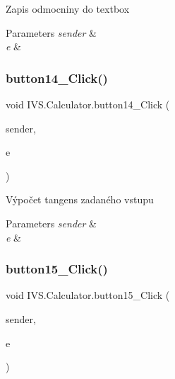 Zapis odmocniny do textbox 


\begin{DoxyParams}{Parameters}
{\em sender} & \\
\hline
{\em e} & \\
\hline
\end{DoxyParams}
\mbox{\label{class_i_v_s_1_1_calculator_acbac3db9d87c440d5f18b67349b8cd29}} 
\subsubsection{\texorpdfstring{button14\+\_\+\+Click()}{button14\_Click()}}
{\footnotesize\ttfamily void I\+V\+S.\+Calculator.\+button14\+\_\+\+Click (\begin{DoxyParamCaption}\item[{object}]{sender,  }\item[{Event\+Args}]{e }\end{DoxyParamCaption})\hspace{0.3cm}{\ttfamily [protected]}}



Výpočet tangens zadaného vstupu 


\begin{DoxyParams}{Parameters}
{\em sender} & \\
\hline
{\em e} & \\
\hline
\end{DoxyParams}
\mbox{\label{class_i_v_s_1_1_calculator_a4aab8fcd134875c22735f5c69709f3a9}} 
\subsubsection{\texorpdfstring{button15\+\_\+\+Click()}{button15\_Click()}}
{\footnotesize\ttfamily void I\+V\+S.\+Calculator.\+button15\+\_\+\+Click (\begin{DoxyParamCaption}\item[{object}]{sender,  }\item[{Event\+Args}]{e }\end{DoxyParamCaption})\hspace{0.3cm}{\ttfamily [protected]}}



